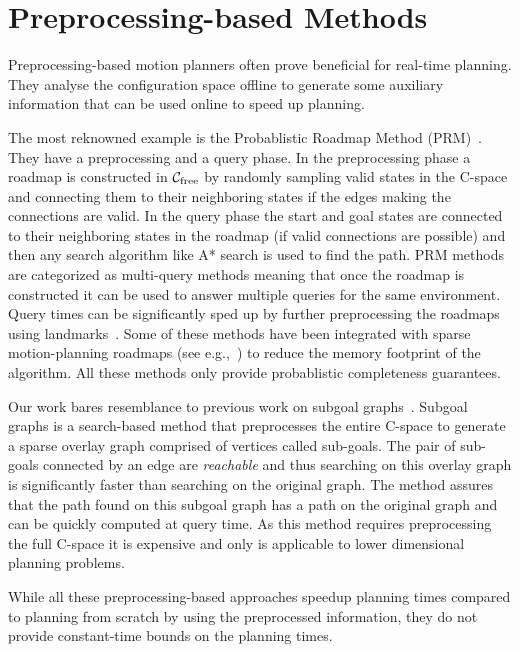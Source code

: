 \documentclass[a4paper]{report}
\begin{document}
\section{Preprocessing-based Methods}
Preprocessing-based motion planners often prove beneficial for real-time planning. They analyse the configuration space offline to generate some auxiliary information that can be used online to speed up planning. 

The most reknowned example is the Probablistic Roadmap Method (PRM)~\cite{kavraki1996probabilistic}. They have a preprocessing and a query phase. In the preprocessing phase a roadmap is constructed in $\mathcal{C}_{\rm free}$ by randomly sampling valid states in the C-space and connecting them to their neighboring states if the edges making the connections are valid. In the query phase the start and goal states are connected to their neighboring states in the roadmap (if valid connections are possible) and then any search algorithm like A* search is used to find the path. PRM methods are categorized as multi-query methods meaning that once the roadmap is constructed it can be used to answer multiple queries for the same environment. Query times can be significantly sped up by further preprocessing the roadmaps using landmarks~\cite{paden2017landmark}. Some of these methods have been integrated with sparse motion-planning roadmaps (see e.g.,~\cite{SSAH14,DB14}) to reduce the memory footprint of the algorithm. All these methods only provide probablistic completeness guarantees.

Our work bares resemblance to previous work on 
subgoal graphs~\cite{UK17,UK18}.
Subgoal graphs is a search-based method that preprocesses the entire C-space to generate a sparse overlay graph comprised of vertices called sub-goals. The pair of sub-goals connected by an edge are \emph{reachable} and thus searching on this overlay graph is significantly faster than searching on the original graph. The method assures that the path found on this subgoal graph has a path on the original graph and can be quickly computed at query time. As this method requires preprocessing the full C-space it is expensive and only is applicable to lower dimensional planning problems.

While all these preprocessing-based approaches speedup planning times compared to planning from scratch by using the preprocessed information, they do not provide constant-time bounds on the planning times.
\end{document}
